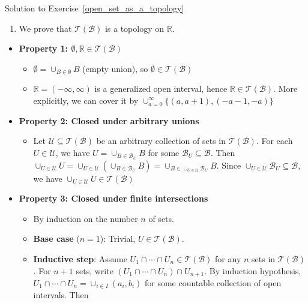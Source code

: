 \begin{mystsolution}{Solution to Exercise~\ref{open_set_as_a_topology}}\begin{enumerate}
\item We prove that $\mathcal{T}(\mathcal{B})$ is a topology on $\mathbb{R}$.
\end{enumerate}

\begin{itemize}
\item \textbf{Property 1: $\emptyset, \mathbb{R} \in \mathcal{T}(\mathcal{B})$}

\begin{itemize}
\item $\emptyset = \cup_{B \in \emptyset} B$ (empty union), so $\emptyset \in \mathcal{T}(\mathcal{B})$
\item $\mathbb{R} = ( -\infty, \infty)$ is a generalized open interval, hence $\mathbb{R} \in \mathcal{T}(\mathcal{B})$. More explicitly, we can cover it by $\cup_{a=0}^{\infty} \{(a,a+1),( -a -1, -a)\}$
\end{itemize}


\item \textbf{Property 2: Closed under arbitrary unions}

\begin{itemize}
\item Let $\mathcal{U} \subseteq \mathcal{T}(\mathcal{B})$ be an arbitrary collection of sets in $\mathcal{T}(\mathcal{B})$. For each $U \in \mathcal{U}$, we have $U = \cup_{B \in \mathcal{B}_U} B$ for some $\mathcal{B}_U \subseteq \mathcal{B}$. Then $\cup_{U \in \mathcal{U}} U = \cup_{U \in \mathcal{U}} \left(\cup_{B \in \mathcal{B}_U} B\right) = \cup_{B \in \cup_{U \in \mathcal{U}} \mathcal{B}_U} B$. Since $\cup_{U \in \mathcal{U}} \mathcal{B}_U \subseteq \mathcal{B}$, we have $\cup_{U \in \mathcal{U}} U \in \mathcal{T}(\mathcal{B})$
\end{itemize}


\item \textbf{Property 3: Closed under finite intersections}

\begin{itemize}
\item By induction on the number $n$ of sets.
\item \textbf{Base case} ($n=1$): Trivial, $U \in \mathcal{T}(\mathcal{B})$.
\item \textbf{Inductive step}: Assume $U_1 \cap \cdots \cap U_n \in \mathcal{T}(\mathcal{B})$ for any $n$ sets in $\mathcal{T}(\mathcal{B})$.
For $n+1$ sets, write $(U_1 \cap \cdots \cap U_n) \cap U_{n+1}$. By induction hypothesis, $U_1 \cap \cdots \cap U_n = \cup_{i \in I}(a_i, b_i)$
for some countable collection of open intervals. Then


\end{itemize}
\end{itemize}
\end{mystsolution}

